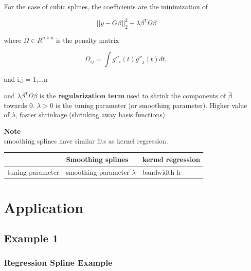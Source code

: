 \documentclass[
]{book}
\begin{document}
For the case of cubic splines, the coefficients are the minimization of

\[
||y - G\beta||^2_2 + \lambda \beta^T \Omega \beta
\]

where \(\Omega \in R^{n \times n}\) is the penalty matrix

\[
\Omega_{ij} = \int g''_i(t) g''_j(t) dt,
\]

and i,j = 1,..,n

and \(\lambda \beta^T \Omega \beta\) is the \textbf{regularization term} used to shrink the components of \(\hat{\beta}\) towards 0. \(\lambda > 0\) is the tuning parameter (or smoothing parameter). Higher value of \(\lambda\), faster shrinkage (shrinking away basis functions)

\textbf{Note}\\
smoothing splines have similar fits as kernel regression.

\begin{longtable}[]{@{}lll@{}}
\toprule
& Smoothing splines & kernel regression\tabularnewline
\midrule
\endhead
tuning parameter & smoothing parameter \(\lambda\) & bandwidth h\tabularnewline
\bottomrule
\end{longtable}

\hypertarget{application}{%
\section{Application}\label{application}}

\hypertarget{example-1}{%
\subsection{Example 1}\label{example-1}}

\citep[7.8]{james2013}

\hypertarget{regression-spline-example}{%
\subsubsection{Regression Spline Example}\label{regression-spline-example}}
\end{document}
